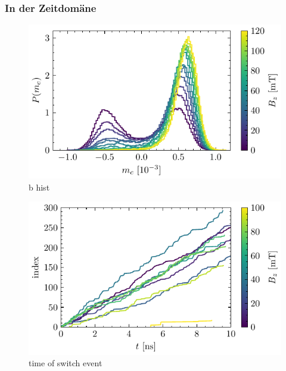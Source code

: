 \documentclass[main.tex]{subfiles}
\begin{document}

\subsubsection{In der Zeitdomäne}

\begin{figure}[H]
    \centering
    \includegraphics{bilder/plots/max_Bz/mc_hist.pdf}
    \caption{b hist}\label{fig:b-hist}    
\end{figure}

\begin{figure}[H]
    \centering
    \includegraphics{bilder/plots/max_Bz/switch_events.pdf}
    \caption{time of switch event}\label{fig:bz-switch-events}   
\end{figure}
\end{document}
